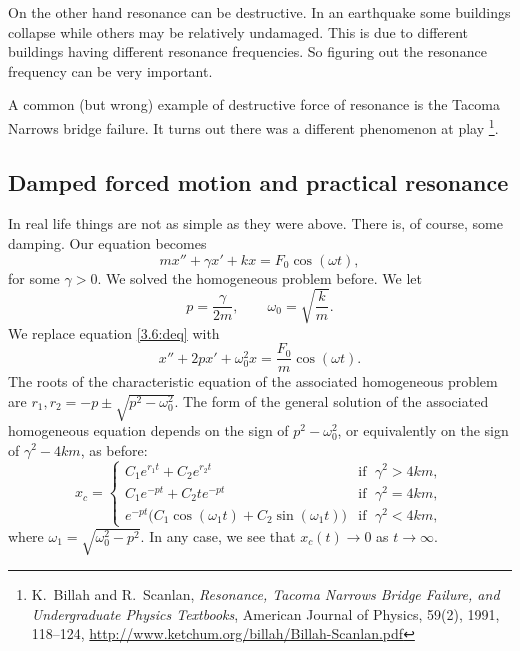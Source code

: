 On the other hand resonance can be destructive.
In an earthquake some buildings collapse while
others may be relatively undamaged.  This is due to different buildings
having different resonance frequencies.  So figuring out the resonance
frequency can be very important.

A common (but wrong) example of destructive force of resonance is the Tacoma
Narrows bridge failure.  It turns out there was a different
phenomenon at play%
\footnote{K.\ Billah and R.\ Scanlan, \emph{Resonance, Tacoma Narrows
Bridge Failure, and Undergraduate Physics Textbooks}, American Journal of
Physics, 59(2), 1991, 118--124,
\url{http://www.ketchum.org/billah/Billah-Scanlan.pdf}}.

\subsection{Damped forced motion and practical resonance}

In real life things are not as simple as they were above.  There is,
of course, some damping.  Our equation becomes
\begin{equation} \label{3.6:deq}
mx'' + \gamma x' + kx = F_0 \cos (\omega t) ,
\end{equation}
for some $\gamma > 0$.  We solved the homogeneous problem before.  We let
\begin{equation*}
p = \frac{\gamma}{2m},  \qquad \omega_0 = \sqrt{\frac{k}{m}} .
\end{equation*}
We replace equation \eqref{3.6:deq} with
\begin{equation*}
x'' + 2px' + \omega_0^2x = \frac{F_0}{m} \cos (\omega t) .
\end{equation*}
The roots of the characteristic equation of the associated
homogeneous problem are $r_1,r_2 = -p \pm \sqrt{p^2 - \omega_0^2}$.  The form
of the general solution of the associated homogeneous equation
depends on the sign of $p^2 - \omega_0^2$, or
equivalently on the sign of $\gamma^2 - 4km$, as before:
\begin{equation*}
x_c =
\begin{cases}
C_1 e^{r_1 t} + C_2 e^{r_2 t} & \text{if } \; \gamma^2 > 4km , \\
C_1 e^{-p t} + C_2 t e^{-p t} & \text{if } \; \gamma^2 = 4km , \\
e^{-p t} \bigl( C_1 \cos (\omega_1 t) + C_2 \sin (\omega_1 t) \bigr) &
  \text{if } \; \gamma^2 < 4km ,
\end{cases}
\end{equation*}
where $\omega_1 = \sqrt{\omega_0^2 - p^2}$.  In any case, we see that
$x_c(t) \to 0$ as $t \to \infty$.

